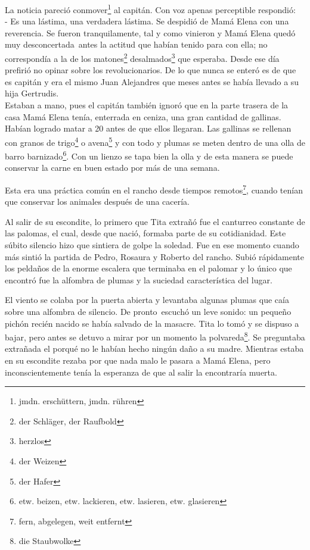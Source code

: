 La noticia pareció conmover\footnote{jmdn. erschüttern, jmdn. rühren}
al capitán. Con voz apenas perceptible respondió:
\\- Es una lástima, una verdadera lástima. %
Se despidió de Mamá Elena con una reverencia. Se fueron tranquilamente, %
tal y como vinieron y Mamá Elena quedó muy desconcertada~antes la %
actitud que habían tenido para con ella; no correspondía a la de los matones\footnote{der Schläger, der Raufbold} desalmados\footnote{herzlos} %
que esperaba. %
Desde ese día prefirió no opinar sobre los revolucionarios. De lo que nunca %
se enteró es de que es capitán y era el mismo Juan Alejandres que meses antes %
se había llevado a su hija Gertrudis.\\

Estaban a mano, pues el capitán también ignoró que en la parte trasera
de la casa Mamá Elena tenía, enterrada en ceniza, una gran cantidad de
gallinas. Habían logrado matar a 20 antes de que ellos llegaran. Las
gallinas se rellenan con granos de trigo\footnote{der Weizen}
o avena\footnote{der Hafer } y con todo y plumas se
meten dentro de una olla de barro barnizado\footnote{etw. beizen, etw. lackieren, etw. lasieren, etw. glasieren}.
Con un lienzo se tapa bien la olla y de esta manera se puede conservar
la carne en buen estado por más de una semana.

Esta era una práctica común en el rancho desde tiempos remotos\footnote{fern, abgelegen, weit entfernt},
cuando tenían que conservar los animales después de una cacería.

Al salir de su escondite, lo primero que Tita extrañó fue el canturreo
constante de las palomas, el cual, desde que nació, formaba parte de su
cotidianidad. Este súbito silencio hizo que sintiera de golpe la
soledad. Fue en ese momento cuando más sintió la partida de Pedro,
Rosaura y Roberto del rancho. Subió rápidamente los peldaños de la
enorme escalera que terminaba en el palomar y lo único que encontró fue
la alfombra de plumas y la suciedad característica del lugar.

El viento se colaba por la puerta abierta y levantaba algunas plumas
que caía sobre una alfombra de silencio. De pronto~escuchó un
leve sonido: un pequeño pichón recién nacido se había salvado de la
masacre. Tita lo tomó y se dispuso a bajar, pero antes se detuvo a mirar
por un momento la polvareda\footnote{die Staubwolke}. Se
preguntaba extrañada el porqué no le habían hecho ningún daño a su madre.
Mientras estaba en su escondite rezaba por que nada malo le pasara a Mamá
Elena, pero inconscientemente tenía la esperanza de que al salir la
encontraría muerta.

